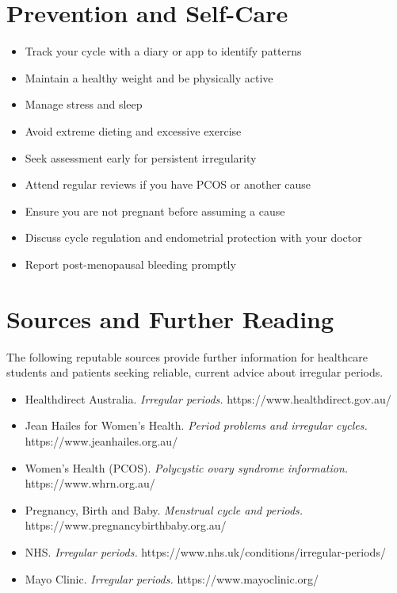 \section*{Prevention and Self-Care}
\begin{itemize}
    \item Track your cycle with a diary or app to identify patterns
    \item Maintain a healthy weight and be physically active
    \item Manage stress and sleep
    \item Avoid extreme dieting and excessive exercise
    \item Seek assessment early for persistent irregularity
    \item Attend regular reviews if you have PCOS or another cause
    \item Ensure you are not pregnant before assuming a cause
    \item Discuss cycle regulation and endometrial protection with your doctor
    \item Report post-menopausal bleeding promptly
\end{itemize}

\section*{Sources and Further Reading}
The following reputable sources provide further information for healthcare students and patients seeking reliable, current advice about irregular periods.
\begin{itemize}
    \item Healthdirect Australia. \textit{Irregular periods.} https://www.healthdirect.gov.au/
    \item Jean Hailes for Women's Health. \textit{Period problems and irregular cycles.} https://www.jeanhailes.org.au/
    \item Women's Health (PCOS). \textit{Polycystic ovary syndrome information.} https://www.whrn.org.au/
    \item Pregnancy, Birth and Baby. \textit{Menstrual cycle and periods.} https://www.pregnancybirthbaby.org.au/
    \item NHS. \textit{Irregular periods.} https://www.nhs.uk/conditions/irregular-periods/
    \item Mayo Clinic. \textit{Irregular periods.} https://www.mayoclinic.org/
\end{itemize}
